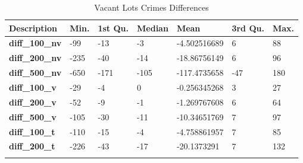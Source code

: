 \documentclass{article}
\begin{document}
\begin{table}[H]
\begin{center}
\caption{\label{tab:ab}Vacant Lots Crimes Differences}
\begin{tabular}{lllllll}
\hline
\textbf{Description}             & \textbf{Min.} & \textbf{1st Qu.} & \textbf{Median} & \textbf{Mean} & \textbf{3rd Qu.} & \textbf{Max.} \\ \hline
\textbf{diff\_100\_nv}        & -99           & -13              & -3              & -4.502516689  & 6                & 88            \\
\textbf{diff\_200\_nv}        & -235          & -40              & -14             & -18.86756149  & 6                & 96            \\
\textbf{diff\_500\_nv}        & -650          & -171             & -105            & -117.4735658  & -47              & 180           \\
\textbf{diff\_100\_v}         & -29           & -4               & 0               & -0.256345268  & 3                & 27            \\
\textbf{diff\_200\_v}         & -52           & -9               & -1              & -1.269767608  & 6                & 64            \\
\textbf{diff\_500\_v}         & -105          & -30              & -11             & -10.34651769  & 7                & 97            \\
\textbf{diff\_100\_t}         & -110          & -15              & -4              & -4.758861957  & 7                & 85            \\
\textbf{diff\_200\_t}         & -226          & -43              & -17             & -20.1373291   & 7                & 132           \\
                                 &               &                  &                 &               &                  &              
\end{tabular}
\end{center}
\end{table}
\end{document}

